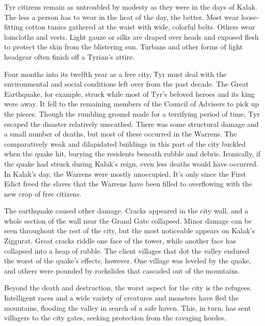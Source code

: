 {	Tyr citizens remain as untroubled by modesty as they were in the days of Kalak. The less a person has to wear in the heat of the day, the better. Most wear loose‐fitting cotton tunics gathered at the waist with wide, colorful belts. Others wear loincloths and vests. Light gauze or silks are draped over heads and exposed flesh to protect the skin from the blistering sun. Turbans and other forms of light headgear often finish off a Tyrian’s attire.
}
{
	Four months into its twelfth year as a free city, Tyr must deal with the environmental and social conditions left over from the past decade. The Great Earthquake, for example, struck while most of Tyr’s beloved heroes and its king were away. It fell to the remaining members of the Council of Advisers to pick up the pieces. Though the rumbling ground made for a terrifying period of time, Tyr escaped the disaster relatively unscathed. There was some structural damage and a small number of deaths, but most of these occurred in the Warrens. The comparatively weak and dilapidated buildings in this part of the city buckled when the quake hit, burying the residents beneath rubble and debris. Ironically, if the quake had struck during Kalak’s reign, even less deaths would have occurred. In Kalak’s day, the Warrens were mostly unoccupied. It’s only since the First Edict freed the slaves that the Warrens have been filled to overflowing with the new crop of free citizens.

	The earthquake caused other damage. Cracks appeared in the city wall, and a whole section of the wall near the Grand Gate collapsed. Minor damage can be seen throughout the rest of the city, but the most noticeable appears on Kalak’s Ziggurat. Great cracks riddle one face of the tower, while another face has collapsed into a heap of rubble. The client villages that dot the valley endured the worst of the quake’s effects, however. One village was leveled by the quake, and others were pounded by rockslides that cascaded out of the mountains.

	Beyond the death and destruction, the worst aspect for the city is the refugees. Intelligent races and a wide variety of creatures and monsters have fled the mountains, flooding the valley in search of a safe haven. This, in turn, has sent villagers to the city gates, seeking protection from the ravaging hordes.

}
